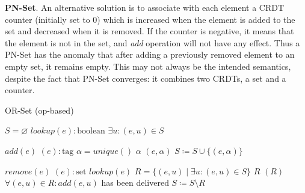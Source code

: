 \textbf{PN-Set}. An alternative solution is to associate with each element a
CRDT counter (initially set to 0) which is increased when the element is added
to the set and decreased when it is removed. If the counter is negative, it
means that the element is not in the set, and \textit{add} operation will not
have any effect. Thus a PN-Set has the anomaly that after adding a previously
removed element to an empty set, it remains empty. This may not always be the
intended semantics, despite the fact that PN-Set converges: it combines two
CRDTs, a set and a counter.

\begin{algorithm}[t]
\small{
	\caption{OR-Set (op-based)}
 	\label{alg:or_set_op_based}                       

 	\begin{algorithmic}[1]
 	  \State \Payload $S = \varnothing$
 	  \State \Query $lookup(e) : \text{boolean}$
 	  \State \hspace{\algorithmicindent} \Return $\exists u : (e, u) \in S$
 	  
 	  \State \Update $add(e)$
 	  \State \hspace{\algorithmicindent} \Prepare $(e) : \text{tag}$
 	  \State \hspace{\algorithmicindent}\hspace{\algorithmicindent} \Let $\alpha = unique()$
 	  \State \hspace{\algorithmicindent}\hspace{\algorithmicindent} \Return $\alpha$
 	  \State \hspace{\algorithmicindent} \Effect $(e, \alpha)$ 
 	  \State \hspace{\algorithmicindent}\hspace{\algorithmicindent} $S \coloneqq S \cup \{(e, \alpha)\}$
 	  
 	  \State \Update $remove(e)$
 	  \State \hspace{\algorithmicindent} \Prepare $(e) : \text{set}$
 	  \State \hspace{\algorithmicindent}\hspace{\algorithmicindent} \Pre $lookup(e)$
 	  \State \hspace{\algorithmicindent}\hspace{\algorithmicindent} \Let $R = \{(e, u) \mid \exists u : (e, u) \in S\}$
 	  \State \hspace{\algorithmicindent}\hspace{\algorithmicindent} \Return $R$
 	  \State \hspace{\algorithmicindent} \Effect $(R)$ 
 	  \State \hspace{\algorithmicindent}\hspace{\algorithmicindent} \Pre $\forall (e, u) \in R : add(e, u)$ has been delivered
 	  \State \hspace{\algorithmicindent}\hspace{\algorithmicindent} $S \coloneqq S \setminus R$
	\end{algorithmic}
 }
\end{algorithm}

